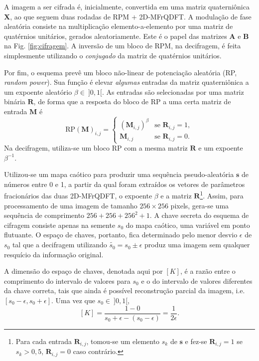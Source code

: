 A imagem a ser cifrada \'e, inicialmente, convertida em uma matriz quaterni\^onica $ \mathbf{X} $, ao que seguem duas rodadas de RPM $ + $ 2D-MFrQDFT. A modula\c c\~ao de fase aleat\'oria consiste na multiplica\c c\~ao elemento-a-elemento por uma matriz de quat\'ernios unit\'arios, gerados aleatoriamente. Este \'e o papel das matrizes $ \mathbf{A} $ e $ \mathbf{B} $ na Fig. \ref{fig:cifragem}. A invers\~ao de um bloco de RPM, na decifragem, \'e feita simplesmente utilizando o \textit{conjugado} da matriz de quat\'ernios unit\'arios.

Por fim, o esquema prev\^e um bloco n\~ao-linear de potencia\c c\~ao aleat\'oria (RP, \textit{random power}). Sua fun\c c\~ao \'e elevar \textit{algumas} entradas da matriz quaterni\^onica a um expoente aleat\'orio $ \beta \in \ ]0,1[$. As entradas s\~ao selecionadas por uma matriz bin\'aria $ \mathbf{R} $, de forma que a resposta do bloco de RP a uma certa matriz de entrada $ \mathbf{M} $ \'e
\begin{equation}
\text{RP}(\mathbf{M})_{i,j} =
\begin{cases}
(\mathbf{M}_{i,j})^\beta & \text{se } \mathbf{R}_{i,j} = 1, \\
\mathbf{M}_{i,j} & \text{se } \mathbf{R}_{i,j} = 0.
\end{cases}
\end{equation}
Na decifragem, utiliza-se um bloco RP com a mesma matriz $ \mathbf{R} $ e um expoente $ \beta^{-1} $.

Utilizou-se um mapa ca\'otico para produzir uma sequ\^encia pseudo-aleat\'oria $ \mathbf{s} $ de n\'umeros entre 0 e 1, a partir da qual foram extra\'idos os vetores de par\^ametros fracion\'arios das duas 2D-MFrQDFT, o expoente $ \beta $ e a matriz $ \mathbf{R} $\footnote{Para cada entrada $ \mathbf{R}_{i,j} $, tomou-se um elemento $ s_k $ de $ \mathbf{s} $ e fez-se $ \mathbf{R}_{i,j} = 1 $ se $ s_k > 0{,}5 $, $ \mathbf{R}_{i,j} = 0 $ caso contr\'ario.}. Assim, para processamento de uma imagem de tamanho $ 256 \times 256 $ pixels, gera-se uma sequ\^encia de comprimento  $ 256 + 256 + 256^2 + 1  $. A chave secreta do esquema de cifragem consiste apenas na semente $ s_0 $ do mapa ca\'otico, uma vari\'avel em ponto flutuante. O espa\c co de chaves, portanto, fica determinado pelo menor desvio $ \epsilon $ de $ s_0 $ tal que a decifragem utilizando $ \widetilde{s_0} = s_0 \pm \epsilon $ produz uma imagem sem qualquer resqu\'icio da informa\c c\~ao original.

A dimens\~ao do espa\c co de chaves, denotada aqui por $ [K] $, \'e a raz\~ao entre o comprimento do intervalo de valores para $ s_0 $ e o do intervalo de valores diferentes da chave correta, tais que ainda \'e poss\'ivel reconstru\c c\~ao parcial da imagem, i.e. $ [s_0 - \epsilon, s_0 + \epsilon] $. Uma vez que $ s_0 \in \ ]0,1[ $, 
\begin{equation}
[K] = \frac{1 - 0}{s_0 + \epsilon - (s_0 - \epsilon)} = \frac{1}{2 \epsilon}.
\end{equation}

